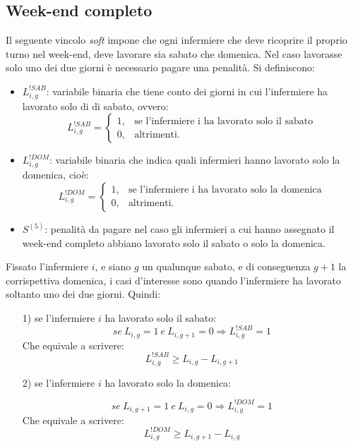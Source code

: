 \subsection{Week-end completo}
Il seguente vincolo \textit{soft} impone che ogni infermiere che deve ricoprire il proprio turno nel week-end, deve lavorare sia sabato che domenica. Nel caso lavorasse solo uno dei due giorni è necessario pagare una penalità. Si definiscono:
\begin{itemize}
\item $L_{i, g}^{!SAB}$: variabile binaria che tiene conto dei giorni in cui l'infermiere ha lavorato solo di di sabato, ovvero:
\begin{equation}
\label{eq:varLavoratoSoloSabato}
L_{i, g}^{!SAB}=
\begin{cases}
1, & \text{se l'infermiere i ha lavorato solo il sabato} \\
0, & \text{altrimenti.}
\end{cases}
\end{equation}
\item $L_{i, g}^{!DOM}$: variabile binaria che indica quali infermieri hanno lavorato solo la domenica, cioè:
\begin{equation}
\label{eq:varLavoratoSoloDomenica}
L_{i, g}^{!DOM}=
\begin{cases}
1, & \text{se l'infermiere i ha lavorato solo la domenica} \\
0, & \text{altrimenti.}
\end{cases}
\end{equation}
\item $S^{(5)}$: penalità da pagare nel caso gli infermieri a cui hanno assegnato il week-end completo abbiano lavorato solo il sabato o solo la domenica. 
\end{itemize}

Fissato l'infermiere $i$, e siano $g$ un qualunque sabato, e di conseguenza $g+1$ la corrispettiva domenica, i casi d'interesse sono quando l'infermiere ha lavorato soltanto uno dei due giorni. Quindi:
\begin{itemize}
\item [1)] se l'infermiere $i$ ha lavorato solo il sabato:
\begin{equation}
se ~ L_{i, g} = 1 ~ e ~ L_{i, g+1} = 0 \Longrightarrow L_{i, g}^{!SAB} = 1 
\end{equation}
Che equivale a scrivere:
\begin{equation}
L_{i, g}^{!SAB} \geq L_{i, g} - L_{i, g+1}
\end{equation}

\item [2)] se l'infermiere $i$ ha lavorato solo la domenica:

\begin{equation}
se ~ L_{i, g+1} = 1 ~ e ~ L_{i, g} = 0 \Longrightarrow L_{i, g}^{!DOM} = 1 
\end{equation}
Che equivale a scrivere:
\begin{equation}
L_{i, g}^{!DOM} \geq L_{i, g+1} - L_{i, g}
\end{equation}
\end{itemize}

